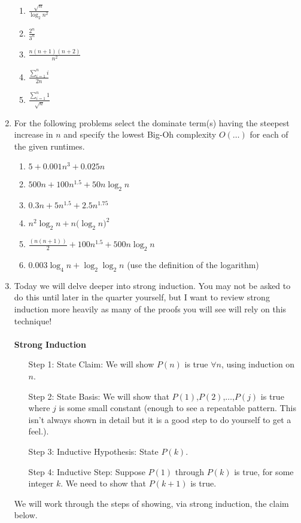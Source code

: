 \documentclass[12pt]{article}
\begin{document}
\begin{enumerate}
\begin{enumerate}
\item $\frac{\sqrt{n}}{\log_2{n^2}}$
\item $\frac{2^n}{3^n}$
\item $\frac{n(n+1)(n+2)}{n^2}$
\item $\frac{\sum\limits_{i=1}^{n}i}{2n}$
\item $\frac{\sum\limits_{i=1}^{n}1}{\sqrt{n}}$
\end{enumerate}
\newpage
\item For the following problems select the dominate term(s) having the 
steepest increase in $n$ and specify the lowest Big-Oh complexity $O(\dots)$
for each of the given runtimes.
\begin{enumerate}
\item $5+0.001n^3+0.025n$
\item $500n+100n^{1.5}+50n\log_2{n}$
\item $0.3n+5n^{1.5}+2.5n^{1.75}$
\item $n^2\log_2{n}+n(\log_2{n)^2}$
\item $\frac{(n(n+1))}{2} + 100n^{1.5} + 500n\log_2{n}$
\item $0.003\log_4{n}+\log_2{\log_2{n}}$ (use the definition of the logarithm)
\end{enumerate}
\newpage
\item Today we will delve deeper into strong induction. You may not 
be asked to do this until later in the quarter yourself, but I want 
to review strong induction more heavily as many of the proofs you will 
see will rely on this technique! 
\\\\
\textbf{Strong Induction}\\
\begin{enumerate}
\item[Step 1:] State Claim: We will show $P(n)$ is true $\forall n$, 
using induction on $n$.
\item[Step 2:]  State Basis: We will show that $P(1)$,$P(2)$,$\dots$,$P(j)$ is true where $j$ is some small constant (enough 
to see a repeatable pattern. This isn't always shown in detail but it is a good step to do yourself to get a feel.).
\item[Step 3:]  Inductive Hypothesis: State $P(k)$.
\item[Step 4:]  Inductive Step: Suppose $P(1)$ through $P(k)$ is true, for some integer $k$.
We need to show that $P(k+1)$ is true. 
\end{enumerate}
We will work through the steps of showing, via strong induction, the claim below.\\

\end{enumerate}
\end{document}

